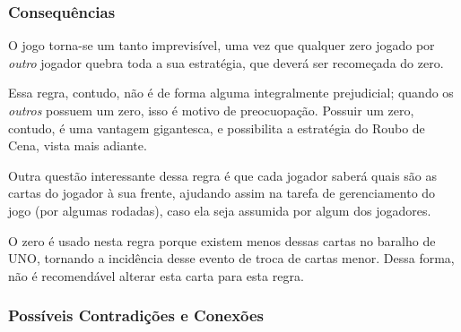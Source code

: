 \subsubsection{Consequências}

O jogo torna-se um tanto imprevisível, uma vez que qualquer zero jogado por \textit{outro} jogador quebra toda a sua estratégia, que deverá ser recomeçada do zero.

Essa regra, contudo, não é de forma alguma integralmente prejudicial; quando os \emph{outros} possuem um zero, isso é motivo de preocuopação. Possuir um zero, contudo, é uma vantagem gigantesca, e possibilita a estratégia do Roubo de Cena, vista mais adiante.

Outra questão interessante dessa regra é que cada jogador saberá quais são as cartas do jogador à sua frente, ajudando assim na tarefa de gerenciamento do jogo (por algumas rodadas), caso ela seja assumida por algum dos jogadores.

O zero é usado nesta regra porque existem menos dessas cartas no baralho de UNO, tornando a incidência desse evento de troca de cartas menor. Dessa forma, não é recomendável alterar esta carta para esta regra.

\subsubsection{Possíveis Contradições e Conexões}

